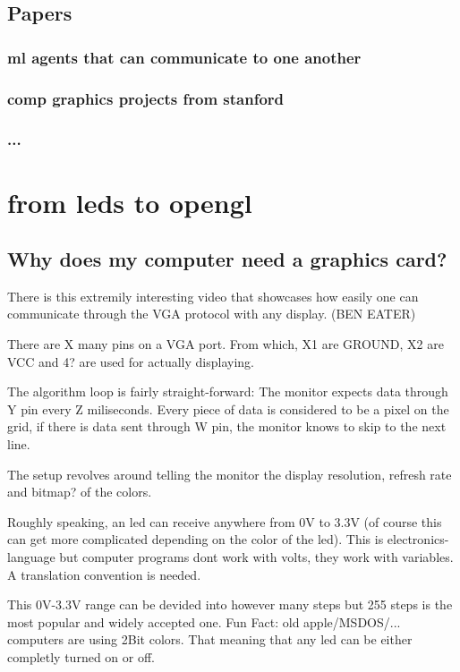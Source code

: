                 \subsection{Papers}
                    \subsubsection{ml agents that can communicate to one another}
                    \subsubsection{comp graphics projects from stanford}
                    \subsubsection{...}

    \section{from leds to opengl}
        \subsection{Why does my computer need a graphics card?}
            There is this extremily interesting video that showcases how easily one can communicate through the VGA protocol with any display. (BEN EATER)

            There are X many pins on a VGA port. From which, X1 are GROUND, X2 are VCC and 4? are used for actually displaying.

            The algorithm loop is fairly straight-forward: The monitor expects data through Y pin every Z miliseconds. Every piece of data is considered to be a pixel on the grid, if there is data sent through W pin, the monitor knows to skip to the next line.

            The setup revolves around telling the monitor the display resolution, refresh rate and bitmap? of the colors. 

            Roughly speaking, an led can receive anywhere from 0V to 3.3V (of course this can get more complicated depending on the color of the led). This is electronics-language but computer programs dont work with volts, they work with variables. A translation convention is needed.

            This 0V-3.3V range can be devided into however many steps but 255 steps is the most popular and widely accepted one. 
            Fun Fact: old apple/MSDOS/... computers are using 2Bit colors. That meaning that any led can be either completly turned on or off.

